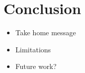 \documentclass[
]{article}
\providecommand{\tightlist}{%
  \setlength{\itemsep}{0pt}\setlength{\parskip}{0pt}}
\begin{document}
\hypertarget{conclusion}{%
\section{Conclusion}\label{conclusion}}

\begin{itemize}
\tightlist
\item
  Take home message
\item
  Limitations
\item
  Future work?
\end{itemize}
\end{document}
